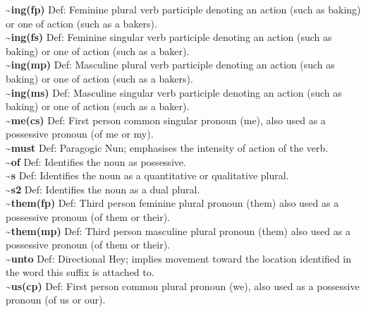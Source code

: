 {\textbf{\textasciitilde{}ing(fp)} Def: Feminine plural verb participle denoting an action (such as baking) or one of action (such as a bakers).\hfill{}\\

\textbf{\textasciitilde{}ing(fs)} Def: Feminine singular verb participle denoting an action (such as baking) or one of action (such as a baker).\hfill{}\\

\textbf{\textasciitilde{}ing(mp)} Def: Masculine plural verb participle denoting an action (such as baking) or one of action (such as a bakers).\hfill{}\\

\textbf{\textasciitilde{}ing(ms)} Def: Masculine singular verb participle denoting an action (such as baking) or one of action (such as a baker).\hfill{}\\

\textbf{\textasciitilde{}me(cs)} Def: First person common singular pronoun (me), also used as a possessive pronoun (of me or my).\hfill{}\\

\textbf{\textasciitilde{}must} Def: Paragogic Nun; emphasises the intensity of action of the verb.\hfill{}\\

\textbf{\textasciitilde{}of} Def: Identifies the noun as possessive.\hfill{}\\

\textbf{\textasciitilde{}s} Def: Identifies the noun as a quantitative or qualitative plural.\hfill{}\\

\textbf{\textasciitilde{}s2} Def: Identifies the noun as a dual plural.\hfill{}\\

\textbf{\textasciitilde{}them(fp)} Def: Third person feminine plural pronoun (them) also used as a possessive pronoun (of them or their).\hfill{}\\

\textbf{\textasciitilde{}them(mp)} Def: Third person masculine plural pronoun (them) also used as a possessive pronoun (of them or their).\hfill{}\\

\textbf{\textasciitilde{}unto} Def: Directional Hey; implies movement toward the location identified in the word this suffix is attached to.\hfill{}\\

\textbf{\textasciitilde{}us(cp)} Def: First person common plural pronoun (we), also used as a possessive pronoun (of us or our).\hfill{}\\

}
